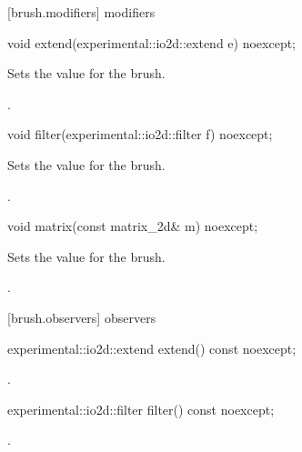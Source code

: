  [brush.modifiers]{ modifiers}

\begin{itemdecl}
    void extend(experimental::io2d::extend e) noexcept;
\end{itemdecl}
\begin{itemdescr}
	\pnum
	\effects
	Sets the  value for the brush.
	
	\pnum
	\postconditions
	.
	
\end{itemdescr}

\begin{itemdecl}
    void filter(experimental::io2d::filter f) noexcept;
\end{itemdecl}
\begin{itemdescr}
	\pnum
	\effects
	Sets the  value for the brush.
	
	\pnum
	\postconditions
	.
	
\end{itemdescr}

\begin{itemdecl}
    void matrix(const matrix_2d& m) noexcept;
\end{itemdecl}
\begin{itemdescr}
	\pnum
	\effects
	Sets the  value for the brush.
	
	\pnum
	\postconditions
	.
	
\end{itemdescr}

 [brush.observers]{ observers}

\begin{itemdecl}
    experimental::io2d::extend extend() const noexcept;
\end{itemdecl}
\begin{itemdescr}
	\pnum
	\returns
	.

\end{itemdescr}

\begin{itemdecl}
    experimental::io2d::filter filter() const noexcept;
\end{itemdecl}
\begin{itemdescr}
	\pnum
	\returns
	.

\end{itemdescr}

